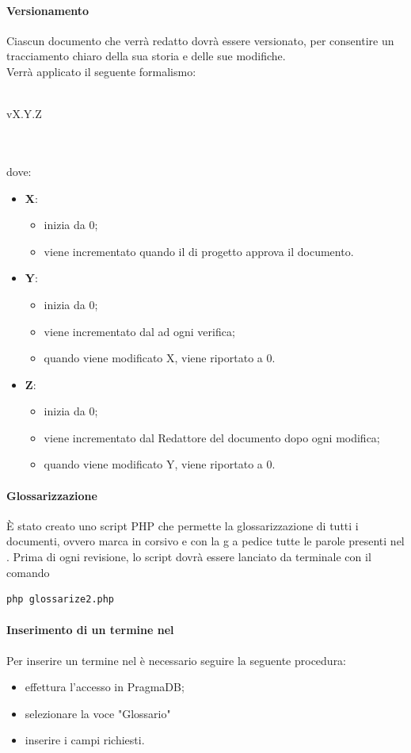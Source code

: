 \paragraph{Versionamento}
Ciascun documento che verrà redatto dovrà essere versionato, per consentire un tracciamento chiaro della sua storia e delle sue modifiche.\\Verrà applicato il seguente formalismo:\\ \\ \centerline{vX.Y.Z}\\ \\dove:
\begin{itemize}
	\item \textbf{X}:
	\begin{itemize}
		\item inizia da 0;
		\item viene incrementato quando il \RESP{} di progetto approva il documento.
	\end{itemize}
	\item \textbf{Y}:
	\begin{itemize}
		\item inizia da 0;
		\item viene incrementato dal \VER{} ad ogni verifica;
		\item quando viene modificato X, viene riportato a 0.
	\end{itemize}
	\item \textbf{Z}:
	\begin{itemize}
		\item inizia da 0;
		\item viene incrementato dal Redattore del documento dopo ogni modifica;
		\item quando viene modificato Y, viene riportato a 0.
	\end{itemize}
\end{itemize}
\paragraph{Glossarizzazione}
È stato creato uno script PHP che permette la glossarizzazione di tutti i documenti, ovvero marca in corsivo e con la g a pedice tutte le parole presenti nel \Gldoc{}. Prima di ogni revisione, lo script dovrà essere lanciato da terminale con il comando \begin{verbatim}
php glossarize2.php
\end{verbatim}

\paragraph{Inserimento di un termine nel \Gldoc}
Per inserire un termine nel \Gldoc è necessario seguire la seguente procedura:
\begin{itemize}
	\item effettura l'accesso in PragmaDB;
	\item selezionare la voce "Glossario"
	\item inserire i campi richiesti.
\end{itemize}
